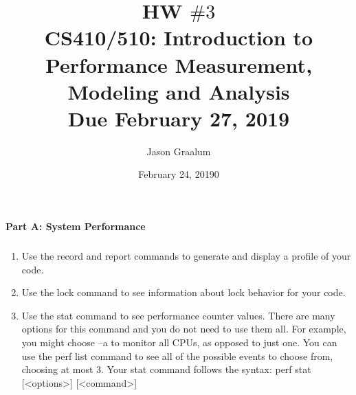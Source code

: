 \documentclass[11pt]{article}
\title{\bf HW $\#3$ \\[2ex]
\rm\normalsize CS410/510: Introduction to Performance Measurement, Modeling and Analysis \\ Due February 27, 2019}
\date{February 24, 20190}
\author{Jason Graalum}
\begin{document}
\maketitle

\paragraph{Part A: System Performance}
\subparagraph{}
\begin{enumerate}

\item Use the record and report commands to generate and display a profile of your code. 

\item Use the lock command to see information about lock behavior for your code.

\item Use the stat command to see performance counter values. There are many options for this command and you do not need to use them all. For example, you might choose –a to monitor all CPUs, as opposed to just one. You can use the perf list command to see all of the possible events to choose from, choosing at most 3. Your stat command follows the syntax:
perf stat [<options>] [<command>]


\end{enumerate}
\end{document}
